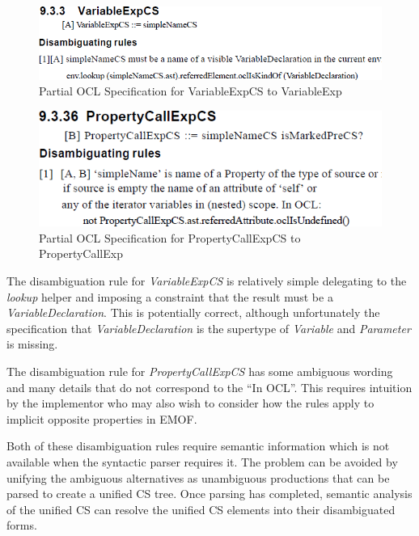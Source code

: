 \documentclass{llncs}
\begin{document}
\begin{figure}[htbp]
	\centering
	\includegraphics[scale=0.49]{images/VariablExpGrammar.PNG}
	\caption{Partial OCL Specification for VariableExpCS to VariableExp}
	\label{fig:varExpGrammar}
\end{figure}

\begin{figure}[htbp]
	\includegraphics[scale=0.5]{images/PropertyCallExpGrammar.PNG}
	\caption{Partial OCL Specification for PropertyCallExpCS to PropertyCallExp}
	\label{fig:propCallExpGrammar}
\end{figure}

The disambiguation rule for \emph{VariableExpCS} is relatively simple delegating to the \emph{lookup} helper and imposing a constraint that the result must be a \emph{VariableDeclaration}. This is potentially correct, although unfortunately the specification that \emph{VariableDeclaration} is the supertype of \emph{Variable} and \emph{Parameter} is missing.

The disambiguation rule for \emph{PropertyCallExpCS} has some ambiguous wording and many details that do not correspond to the ``In OCL''. This requires intuition by the implementor who may also wish to consider how the rules apply to implicit opposite properties in EMOF.

Both of these disambiguation rules require semantic information which is not available when the syntactic parser requires it. The problem can be avoided by unifying the ambiguous alternatives as unambiguous productions that can be parsed to create a unified CS tree. Once parsing has completed, semantic analysis of the unified CS can resolve the unified CS elements into their  disambiguated forms.
\end{document}
